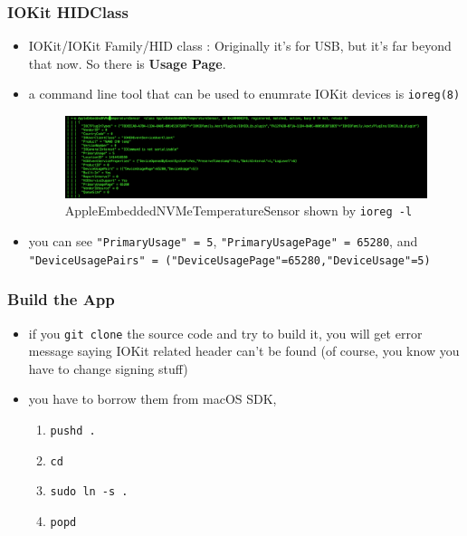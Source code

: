 \documentclass{beamer}
\begin{document}
\begin{frame}
  \frametitle{IOKit HIDClass}
  \begin{itemize}
  \item IOKit/IOKit Family/HID class \cite{iokit:family}: Originally it's for USB, but it's far beyond that now. So there is \textbf{Usage Page}.
    \item a command line tool that can be used to enumrate IOKit devices is \texttt{ioreg(8)}
    \begin{figure}
      \includegraphics[width=\textwidth,keepaspectratio]{ioreg-1.png}
      \caption{AppleEmbeddedNVMeTemperatureSensor shown by \texttt{ioreg -l}}
    \end{figure}
    \item you can see \texttt{"PrimaryUsage" = 5}, \texttt{"PrimaryUsagePage" = 65280}, and \texttt{"DeviceUsagePairs" = ({"DeviceUsagePage"=65280,"DeviceUsage"=5})}
  \end{itemize}
\end{frame}

\begin{frame}
  \frametitle{Build the App}
  \begin{itemize}
  \item if you \texttt{git clone} the source code and try to build it, you will get error message saying IOKit related header can't be found (of course, you know you have to change signing stuff)
  \item you have to borrow them from macOS SDK,
    \begin{enumerate}
    \item \texttt{pushd .}
    \item \texttt{cd }
    \item \texttt{sudo ln -s  .}
    \item \texttt{popd}
    \end{enumerate}
  \end{itemize}
\end{frame}
\end{document}
